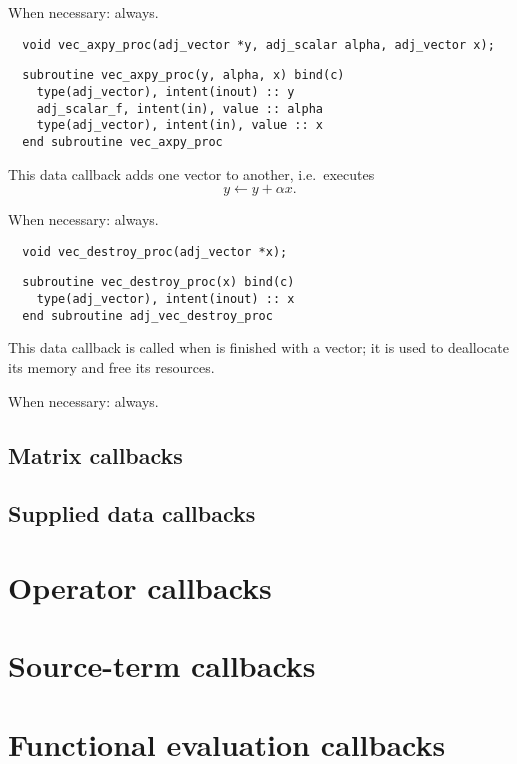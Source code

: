 When necessary: always.
\begin{framed}
\vspace{-0.7cm}
\begin{verbatim}
  void vec_axpy_proc(adj_vector *y, adj_scalar alpha, adj_vector x);
\end{verbatim}
\vspace{-1.0cm}
\begin{verbatim}
  subroutine vec_axpy_proc(y, alpha, x) bind(c)
    type(adj_vector), intent(inout) :: y
    adj_scalar_f, intent(in), value :: alpha
    type(adj_vector), intent(in), value :: x
  end subroutine vec_axpy_proc
\end{verbatim}
\vspace{-0.5cm}
\end{framed}
This data callback adds one vector to another, i.e.\ executes
\begin{equation*}
y \leftarrow y + \alpha x.
\end{equation*}

When necessary: always.
\begin{framed}
\vspace{-0.7cm}
\begin{verbatim}
  void vec_destroy_proc(adj_vector *x);
\end{verbatim}
\vspace{-1.0cm}
\begin{verbatim}
  subroutine vec_destroy_proc(x) bind(c)
    type(adj_vector), intent(inout) :: x
  end subroutine adj_vec_destroy_proc
\end{verbatim}
\vspace{-0.5cm}
\end{framed}
This data callback is called when \libadjoint is finished
with a vector; it is used to deallocate its memory and free
its resources.

When necessary: always.
\subsection{Matrix callbacks}
\subsection{Supplied data callbacks}

\section{Operator callbacks}

\section{Source-term callbacks}

\section{Functional evaluation callbacks}
